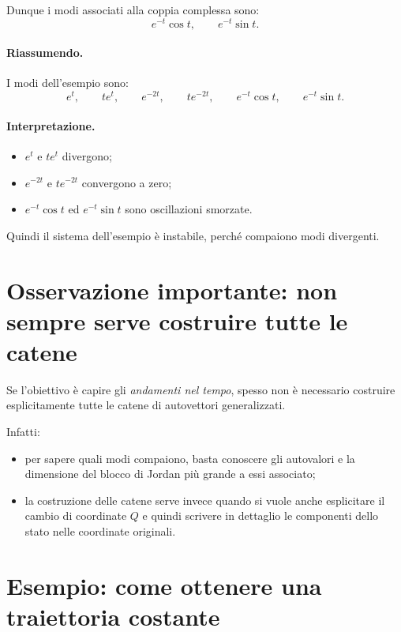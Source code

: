 Dunque i modi associati alla coppia complessa sono:
\[
e^{-t}\cos t,
\qquad
e^{-t}\sin t.
\]

\paragraph{Riassumendo.}
I modi dell'esempio sono:
\begin{equation}
e^t,\qquad te^t,\qquad e^{-2t},\qquad te^{-2t},\qquad e^{-t}\cos t,\qquad e^{-t}\sin t.
\label{eq:L9_modes_example}
\end{equation}

\paragraph{Interpretazione.}
\begin{itemize}
    \item $e^t$ e $te^t$ divergono;
    \item $e^{-2t}$ e $te^{-2t}$ convergono a zero;
    \item $e^{-t}\cos t$ ed $e^{-t}\sin t$ sono oscillazioni smorzate.
\end{itemize}

Quindi il sistema dell'esempio è instabile, perché compaiono modi divergenti.

\section{Osservazione importante: non sempre serve costruire tutte le catene}

Se l'obiettivo è capire gli \emph{andamenti nel tempo}, spesso non è necessario costruire esplicitamente tutte le catene di autovettori generalizzati.

Infatti:
\begin{itemize}
    \item per sapere quali modi compaiono, basta conoscere gli autovalori e la dimensione del blocco di Jordan più grande a essi associato;
    \item la costruzione delle catene serve invece quando si vuole anche esplicitare il cambio di coordinate $Q$ e quindi scrivere in dettaglio le componenti dello stato nelle coordinate originali.
\end{itemize}

\section{Esempio: come ottenere una traiettoria costante}

